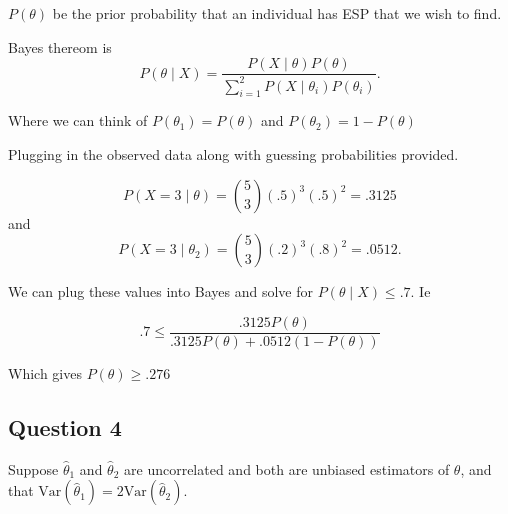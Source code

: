 \documentclass{tufte-book}
\newcommand{\Var}{\mathrm{Var}}
\theoremstyle{mytheoremstyle}
\theoremstyle{mylemstyle}
\theoremstyle{mydefstyle}
\begin{document}
 $P(\theta)$ be the prior probability that an individual has ESP that we wish to find.

Bayes thereom is
\[P(\theta \mid X) = \frac{P(X \mid \theta) P(\theta)}{\sum_{i=1}^2 P(X\mid \theta_i) P(\theta_i)}. \]

Where we can think of $P(\theta_1)= P(\theta)$ and $P(\theta_2) = 1-P(\theta)$

Plugging in the observed data along with guessing probabilities provided.

\[ P(X=3 \mid \theta) = \binom{5}{3}(.5)^3(.5)^2 = .3125 \]
and
\[ P(X=3 \mid \theta_2) = \binom{5}{3}(.2)^3(.8)^2 = .0512. \]

We can plug these values into Bayes and solve for $P(\theta \mid X) \leq .7$.  Ie

\[.7 \leq \frac{.3125P(\theta)}{.3125 P(\theta) + .0512(1-P(\theta))}\]

Which gives $P(\theta) \geq .276$



\subsection{Question 4}

Suppose $\hat{\theta}_1$ and $\hat{\theta}_2$ are uncorrelated and both are unbiased estimators of $\theta$, and that $\Var(\hat{\theta}_1) = 2\Var(\hat{\theta}_2)$.
\end{document}
